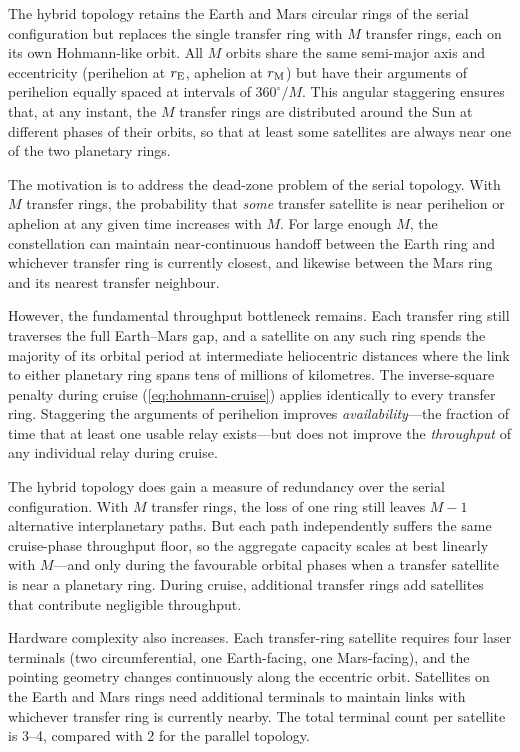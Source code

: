 The hybrid topology retains the Earth and Mars circular rings of the serial
configuration but replaces the single transfer ring with $M$ transfer rings, each
on its own Hohmann-like orbit. All $M$ orbits share the same semi-major axis and
eccentricity (perihelion at $r_{\mathrm{E}}$, aphelion at $r_{\mathrm{M}}$) but have their arguments
of perihelion equally spaced at intervals of $360^\circ/M$. This angular staggering
ensures that, at any instant, the $M$ transfer rings are distributed around the
Sun at different phases of their orbits, so that at least some satellites are
always near one of the two planetary rings.

The motivation is to address the dead-zone problem of the serial topology.
With $M$ transfer rings, the probability that \emph{some} transfer satellite is
near perihelion or aphelion at any given time increases with $M$. For large
enough $M$, the constellation can maintain near-continuous handoff between the
Earth ring and whichever transfer ring is currently closest, and likewise between
the Mars ring and its nearest transfer neighbour.

However, the fundamental throughput bottleneck remains. Each transfer ring still
traverses the full Earth--Mars gap, and a satellite on any such ring spends the
majority of its orbital period at intermediate heliocentric distances where the
link to either planetary ring spans tens of millions of kilometres. The
inverse-square penalty during cruise (\cref{eq:hohmann-cruise}) applies
identically to every transfer ring. Staggering the arguments of perihelion
improves \emph{availability}---the fraction of time that at least one usable
relay exists---but does not improve the \emph{throughput} of any individual relay
during cruise.

The hybrid topology does gain a measure of redundancy over the serial
configuration. With $M$ transfer rings, the loss of one ring still leaves $M - 1$
alternative interplanetary paths. But each path independently suffers the same
cruise-phase throughput floor, so the aggregate capacity scales at best linearly
with $M$---and only during the favourable orbital phases when a transfer
satellite is near a planetary ring. During cruise, additional transfer rings add
satellites that contribute negligible throughput.

Hardware complexity also increases. Each transfer-ring satellite requires four
laser terminals (two circumferential, one Earth-facing, one Mars-facing), and the
pointing geometry changes continuously along the eccentric orbit. Satellites on
the Earth and Mars rings need additional terminals to maintain links with
whichever transfer ring is currently nearby. The total terminal count per
satellite is 3--4, compared with 2 for the parallel topology.

